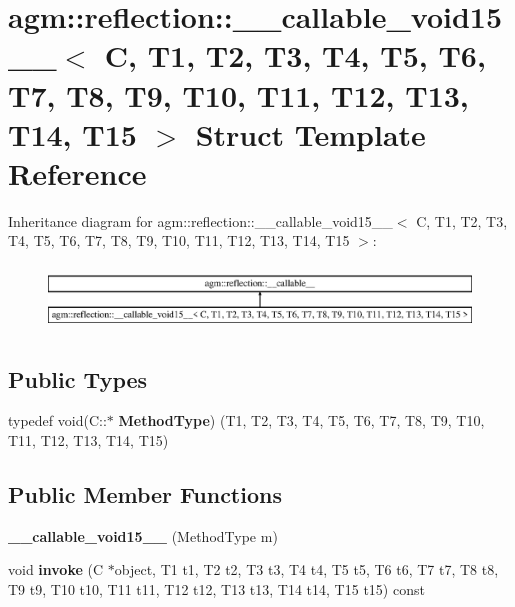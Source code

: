 \hypertarget{structagm_1_1reflection_1_1____callable__void15____}{}\section{agm\+:\+:reflection\+:\+:\+\_\+\+\_\+callable\+\_\+void15\+\_\+\+\_\+$<$ C, T1, T2, T3, T4, T5, T6, T7, T8, T9, T10, T11, T12, T13, T14, T15 $>$ Struct Template Reference}
\label{structagm_1_1reflection_1_1____callable__void15____}
Inheritance diagram for agm\+:\+:reflection\+:\+:\+\_\+\+\_\+callable\+\_\+void15\+\_\+\+\_\+$<$ C, T1, T2, T3, T4, T5, T6, T7, T8, T9, T10, T11, T12, T13, T14, T15 $>$\+:\begin{figure}[H]
\begin{center}
\leavevmode
\includegraphics[height=1.736434cm]{structagm_1_1reflection_1_1____callable__void15____}
\end{center}
\end{figure}
\subsection*{Public Types}
\begin{DoxyCompactItemize}
\item 
typedef void(C\+::$\ast$ {\bfseries Method\+Type}) (T1, T2, T3, T4, T5, T6, T7, T8, T9, T10, T11, T12, T13, T14, T15)\hypertarget{structagm_1_1reflection_1_1____callable__void15_____a9d27b5f1c04b9a3c1f942585e3a59d2d}{}\label{structagm_1_1reflection_1_1____callable__void15_____a9d27b5f1c04b9a3c1f942585e3a59d2d}

\end{DoxyCompactItemize}
\subsection*{Public Member Functions}
\begin{DoxyCompactItemize}
\item 
{\bfseries \+\_\+\+\_\+callable\+\_\+void15\+\_\+\+\_\+} (Method\+Type m)\hypertarget{structagm_1_1reflection_1_1____callable__void15_____a53b4858050bca9590d504f3fe0e6ca0d}{}\label{structagm_1_1reflection_1_1____callable__void15_____a53b4858050bca9590d504f3fe0e6ca0d}

\item 
void {\bfseries invoke} (C $\ast$object, T1 t1, T2 t2, T3 t3, T4 t4, T5 t5, T6 t6, T7 t7, T8 t8, T9 t9, T10 t10, T11 t11, T12 t12, T13 t13, T14 t14, T15 t15) const \hypertarget{structagm_1_1reflection_1_1____callable__void15_____aff0fe8cb5f34963df99a3b45c89f5aee}{}\label{structagm_1_1reflection_1_1____callable__void15_____aff0fe8cb5f34963df99a3b45c89f5aee}

\end{DoxyCompactItemize}
